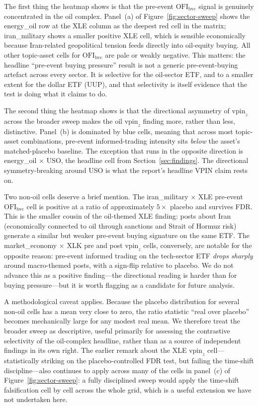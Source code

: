 \documentclass[11pt,a4paper]{article}
\newcommand{\OFI}{\mathrm{OFI}_{\mathrm{bvc}}}
\newcommand{\vpinz}{\mathrm{vpin}_{z}}
\begin{document}
The first thing the heatmap shows is that the pre-event $\OFI$ signal is genuinely concentrated in the oil complex. Panel~(a) of Figure~\ref{fig:sector-sweep} shows the energy\_oil row at the XLE column as the deepest red cell in the matrix; iran\_military shows a smaller positive XLE cell, which is sensible economically because Iran-related geopolitical tension feeds directly into oil-equity buying. All other topic-asset cells for $\OFI$ are pale or weakly negative. This matters: the headline ``pre-event buying pressure'' result is not a generic pre-event-buying artefact across every sector. It is selective for the oil-sector ETF, and to a smaller extent for the dollar ETF (UUP), and that selectivity is itself evidence that the test is doing what it claims to do.

The second thing the heatmap shows is that the directional asymmetry of $\vpinz$ across the broader sweep makes the oil $\vpinz$ finding more, rather than less, distinctive. Panel~(b) is dominated by blue cells, meaning that across most topic-asset combinations, pre-event informed-trading intensity sits \emph{below} the asset's matched-placebo baseline. The exception that runs in the opposite direction is energy\_oil $\times$ USO, the headline cell from Section~\ref{sec:findings}. The directional symmetry-breaking around USO is what the report's headline VPIN claim rests on.

Two non-oil cells deserve a brief mention. The iran\_military $\times$ XLE pre-event $\OFI$ cell is positive at a ratio of approximately $5\times$ placebo and survives FDR. This is the smaller cousin of the oil-themed XLE finding: posts about Iran (economically connected to oil through sanctions and Strait of Hormuz risk) generate a similar but weaker pre-event buying signature on the same ETF. The market\_economy $\times$ XLK pre and post $\vpinz$ cells, conversely, are notable for the opposite reason: pre-event informed trading on the tech-sector ETF \emph{drops sharply} around macro-themed posts, with a sign-flip relative to placebo. We do not advance this as a positive finding---the directional reading is harder than for buying pressure---but it is worth flagging as a candidate for future analysis.

A methodological caveat applies. Because the placebo distribution for several non-oil cells has a mean very close to zero, the ratio statistic ``real over placebo'' becomes mechanically large for any modest real mean. We therefore treat the broader sweep as descriptive, useful primarily for assessing the contrastive selectivity of the oil-complex headline, rather than as a source of independent findings in its own right. The earlier remark about the XLE $\vpinz$ cell---statistically striking on the placebo-controlled FDR test, but failing the time-shift discipline---also continues to apply across many of the cells in panel~(c) of Figure~\ref{fig:sector-sweep}: a fully disciplined sweep would apply the time-shift falsification cell by cell across the whole grid, which is a useful extension we have not undertaken here.
\end{document}
